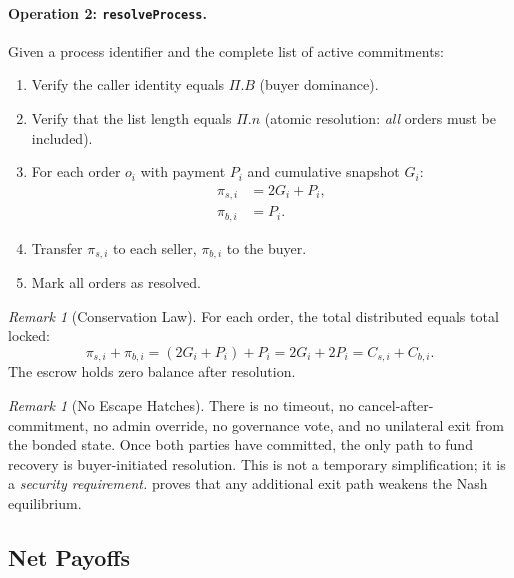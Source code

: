 \documentclass[11pt,a4paper]{article}
\theoremstyle{definition}
\theoremstyle{remark}
\newtheorem{remark}[theorem]{Remark}
\newcommand{\pay}{P}           %
\newcommand{\cumval}{G}        %
\begin{document}
\paragraph{Operation 2: \texttt{resolveProcess}.}
Given a process identifier and the complete list of active commitments:
\begin{enumerate}
  \item Verify the caller identity equals $\Pi.B$ (buyer dominance).
  \item Verify that the list length equals $\Pi.n$ (atomic
    resolution: \emph{all} orders must be included).
  \item For each order $o_i$ with payment $\pay_i$ and cumulative
    snapshot $\cumval_i$:
    \begin{align}
      \pi_{s,i} &= 2\cumval_i + \pay_i, \label{eq:seller-payout} \\
      \pi_{b,i} &= \pay_i. \label{eq:buyer-payout}
    \end{align}
  \item Transfer $\pi_{s,i}$ to each seller, $\pi_{b,i}$ to the buyer.
  \item Mark all orders as resolved.
\end{enumerate}

\begin{remark}[Conservation Law]
\label{rem:conservation}
For each order, the total distributed equals total locked:
\begin{equation}
  \pi_{s,i} + \pi_{b,i} = (2\cumval_i + \pay_i) + \pay_i = 2\cumval_i + 2\pay_i = C_{s,i} + C_{b,i}.
\end{equation}
The escrow holds zero balance after resolution.
\end{remark}

\begin{remark}[No Escape Hatches]
\label{rem:no-escape}
There is no timeout, no cancel-after-commitment, no admin override,
no governance vote, and no unilateral exit from the bonded state.
Once both parties have committed, the only path to fund recovery is
buyer-initiated resolution. This is not a temporary simplification; it
is a \emph{security requirement.}
 proves that any additional exit path
weakens the Nash equilibrium.
\end{remark}

\subsection{Net Payoffs}
\end{document}
